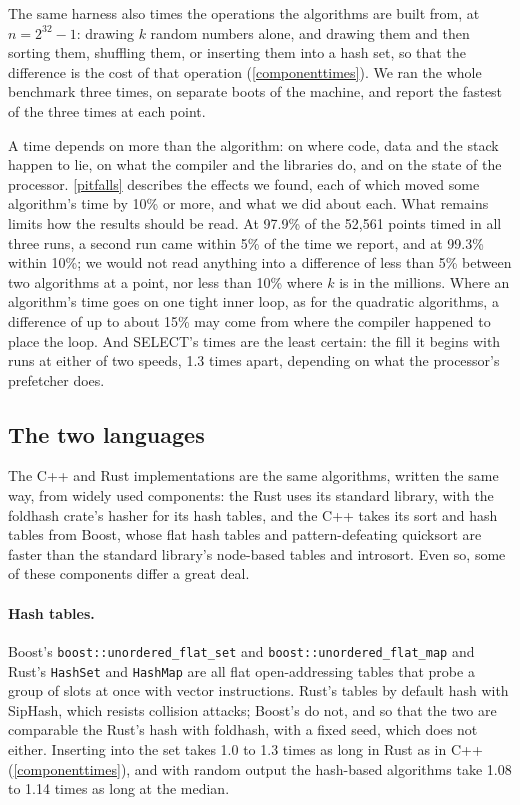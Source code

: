 \documentclass[letterpaper,11pt]{article}
\begin{document}
The same harness also times the operations the algorithms are built
from, at \(n = 2^{32} - 1\): drawing \(k\) random numbers alone, and
drawing them and then sorting them, shuffling them, or inserting them
into a hash set, so that the difference is the cost of that operation
(\autoref{componenttimes}). We ran the whole benchmark three times, on
separate boots of the machine, and report the fastest of the three
times at each point.

A time depends on more than the algorithm: on where code, data and the
stack happen to lie, on what the compiler and the libraries do, and on
the state of the processor. \autoref{pitfalls} describes the effects we
found, each of which moved some algorithm's time by 10\% or more, and
what we did about each. What remains limits how the results should be
read. At 97.9\% of the 52,561 points timed in all three runs, a second
run came within 5\% of the time we report, and at 99.3\% within 10\%;
we would not read anything into a difference of less than 5\% between
two algorithms at a point, nor less than 10\% where \(k\) is in the
millions. Where an algorithm's time goes on one tight inner loop, as
for the quadratic algorithms, a difference of up to about 15\% may come
from where the compiler happened to place the loop. And SELECT's times
are the least certain: the fill it begins with runs at either of two
speeds, 1.3 times apart, depending on what the processor's prefetcher
does.

\subsection{The two languages}

The C++ and Rust implementations are the same algorithms, written the
same way, from widely used components: the Rust uses its standard
library, with the foldhash crate's hasher for its hash tables, and the
C++ takes its sort and hash tables from Boost, whose flat hash tables
and pattern-defeating quicksort are faster than the standard library's
node-based tables and introsort. Even so, some of these components
differ a great deal.

\paragraph{Hash tables.} Boost's
\texttt{boost::unordered_flat_set} and
\texttt{boost::unordered_flat_map} and Rust's
\texttt{HashSet} and \texttt{HashMap} are all flat
open-addressing tables that probe a group of slots at once with vector
instructions. Rust's tables by default hash with SipHash, which resists
collision attacks; Boost's do not, and so that the two are comparable
the Rust's hash with foldhash, with a fixed seed, which does not either. Inserting into
the set takes 1.0 to 1.3 times as long in Rust as in C++
(\autoref{componenttimes}), and with random output the hash-based
algorithms take 1.08 to 1.14 times as long at the median.
\end{document}
